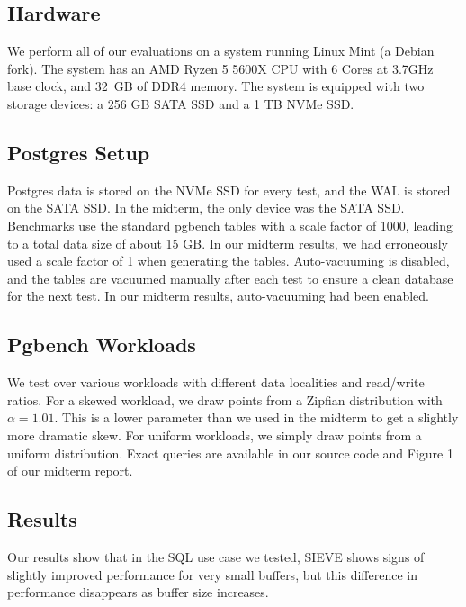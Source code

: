 \documentclass[sigconf]{acmart}
\begin{document}
\subsection{Hardware}

We perform all of our evaluations on a system running Linux Mint (a Debian fork). The system has an AMD Ryzen 5 5600X CPU with 6 Cores at 3.7GHz base clock, and 32 GB of DDR4 memory. The system is equipped with two storage devices: a 256 GB SATA SSD and a 1 TB NVMe SSD.

\subsection{Postgres Setup}

Postgres data is stored on the NVMe SSD for every test, and the WAL is stored on the SATA SSD. In the midterm, the only device was the SATA SSD. Benchmarks use the standard pgbench tables with a scale factor of 1000, leading to a total data size of about 15 GB. In our midterm results, we had erroneously used a scale factor of 1 when generating the tables. Auto-vacuuming is disabled, and the tables are vacuumed manually after each test to ensure a clean database for the next test. In our midterm results, auto-vacuuming had been enabled.

\subsection{Pgbench Workloads}

We test over various workloads with different data localities and read/write ratios. For a skewed workload, we draw points from a Zipfian distribution with $\alpha=1.01$. This is a lower parameter than we used in the midterm to get a slightly more dramatic skew. For uniform workloads, we simply draw points from a uniform distribution. Exact queries are available in our source code and Figure 1 of our midterm report.

\subsection{Results}

Our results show that in the SQL use case we tested, SIEVE shows signs of slightly improved performance for very small buffers, but this difference in performance disappears as buffer size increases.
\end{document}
